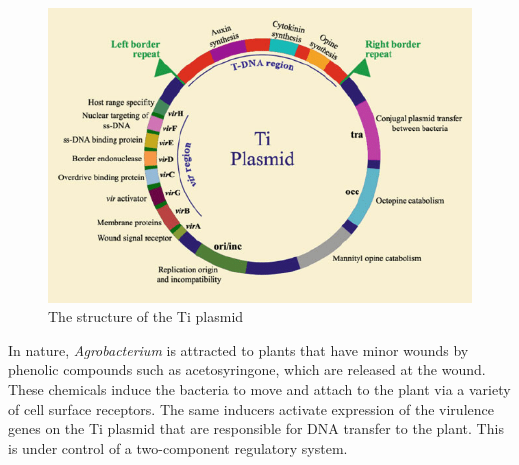 \documentclass[nofonts,]{tufte-handout}
\begin{document}
\begin{figure}
\includegraphics[width=0.9\linewidth]{./images/Ti_plasmid} \caption[The structure of the Ti plasmid]{The structure of the Ti plasmid}\label{fig:ti-plasmid}
\end{figure}

In nature, \emph{Agrobacterium} is attracted to plants that have minor
wounds by phenolic compounds such as acetosyringone, which are released
at the wound. These chemicals induce the bacteria to move and attach to
the plant via a variety of cell surface receptors. The same inducers
activate expression of the virulence genes on the Ti plasmid that are
responsible for DNA transfer to the plant. This is under control of a
two-component regulatory system.
\end{document}
